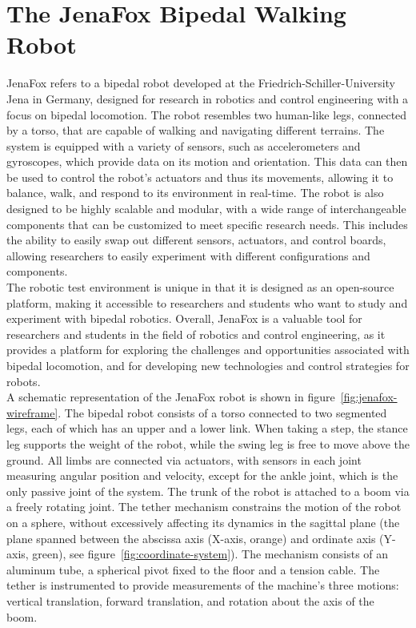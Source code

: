 \section{The JenaFox Bipedal Walking Robot}
\label{sec:jenafox}

    JenaFox refers to a bipedal robot developed at the Friedrich-Schiller-University Jena in Germany, designed for research in robotics and control engineering with a focus on bipedal locomotion. The robot resembles two human-like legs, connected by a torso, that are capable of walking and navigating different terrains. The system is equipped with a variety of sensors, such as accelerometers and gyroscopes, which provide data on its motion and orientation. This data can then be used to control the robot's actuators and thus its movements, allowing it to balance, walk, and respond to its environment in real-time. The robot is also designed to be highly scalable and modular, with a wide range of interchangeable components that can be customized to meet specific research needs. This includes the ability to easily swap out different sensors, actuators, and control boards, allowing researchers to easily experiment with different configurations and components.~\cite{Renjewski2012}\\

    The robotic test environment is unique in that it is designed as an open-source platform, making it accessible to researchers and students who want to study and experiment with bipedal robotics. Overall, JenaFox is a valuable tool for researchers and students in the field of robotics and control engineering, as it provides a platform for exploring the challenges and opportunities associated with bipedal locomotion, and for developing new technologies and control strategies for robots.~\cite{Renjewski2012}\\

    A schematic representation of the JenaFox robot is shown in figure~\ref{fig:jenafox-wireframe}. The bipedal robot consists of a torso connected to two segmented legs, each of which has an upper and a lower link. When taking a step, the stance leg supports the weight of the robot, while the swing leg is free to move above the ground. All limbs are connected via actuators, with sensors in each joint measuring angular position and velocity, except for the ankle joint, which is the only passive joint of the system. The trunk of the robot is attached to a boom via a freely rotating joint. The tether mechanism constrains the motion of the robot on a sphere, without excessively affecting its dynamics in the sagittal plane (\ie the plane spanned between the abscissa axis (X-axis, orange) and ordinate axis (Y-axis, green), see figure~\ref{fig:coordinate-system}). The mechanism consists of an aluminum tube, a spherical pivot fixed to the floor and a tension cable. The tether is instrumented to provide measurements of the machine's three motions: vertical translation, forward translation, and rotation about the axis of the boom.~\cite{Renjewski2012}~\cite{Renjewski2013}

